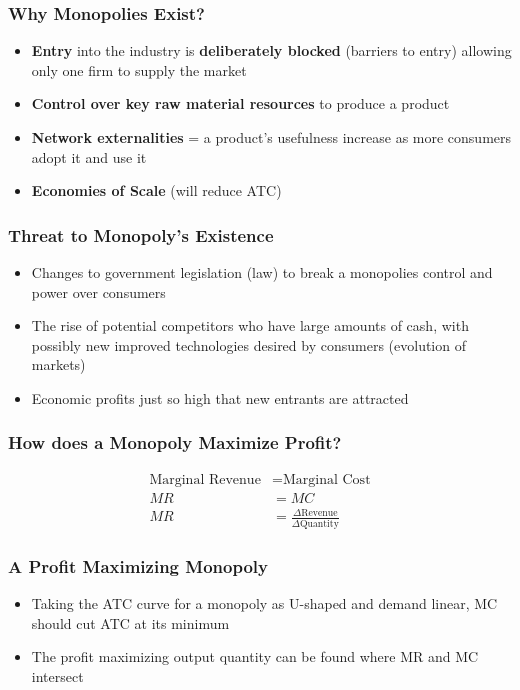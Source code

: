 \subsubsection{Why Monopolies Exist?}
\begin{itemize}
	\item \textbf{Entry} into the industry is \textbf{deliberately blocked} (barriers to entry) allowing only one firm to supply the market
	\item \textbf{Control over key raw material resources} to produce a product
	\item \textbf{Network externalities} = a product's usefulness increase as more consumers adopt it and use it
	\item \textbf{Economies of Scale} (will reduce ATC)
\end{itemize}
\subsubsection{Threat to Monopoly's Existence}
\begin{itemize}
	\item Changes to government legislation (law) to break a monopolies control and power over consumers
	\item The rise of potential competitors who have large amounts of cash, with possibly new improved technologies desired by consumers (evolution of markets)
	\item Economic profits just so high that new entrants are attracted
\end{itemize}
\subsubsection{How does a Monopoly Maximize Profit?}
\begin{align*}
	\text{Marginal Revenue} &= \text{Marginal Cost}\\
	MR&=MC\\
	MR&=\frac{\Delta\text{Revenue}}{\Delta\text{Quantity}}
\end{align*}
\subsubsection{A Profit Maximizing Monopoly}
\begin{itemize}
	\item Taking the ATC curve for a monopoly as U-shaped and demand linear, MC should cut ATC at its minimum
	\item The profit maximizing output quantity can be found where MR and MC intersect
\end{itemize}

